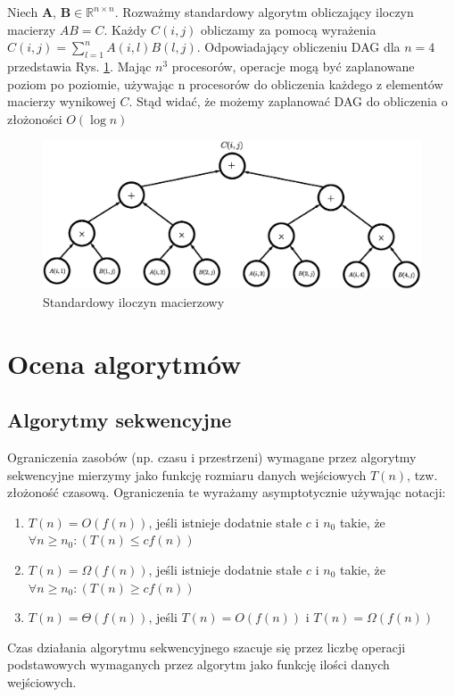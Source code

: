 \begin{przyklad}
Niech \(\mathbf{A}\), \(\mathbf{B}\in\mathbb{R}^{n\times n}\). Rozważmy standardowy algorytm obliczający iloczyn macierzy \(AB = C\). Każdy \(C(i, j)\) obliczamy za pomocą wyrażenia \(C(i, j)=\sum_{l=1}^{n}A(i,l)B(l,j)\). Odpowiadający obliczeniu DAG dla \(n=4\) przedstawia Rys. \ref{fig:standard_parallel}. Mając \(n^3\) procesorów, operacje mogą być zaplanowane poziom po poziomie, używając n procesorów do obliczenia każdego z elementów macierzy wynikowej \(C\). Stąd widać, że możemy zaplanować DAG do obliczenia o złożoności \(O(\log{n})\)
\begin{figure}[H]
\centering
\includegraphics[width=36em]{images/Rys3.eps}
\caption{Standardowy iloczyn macierzowy}
\label{fig:standard_parallel}
\end{figure}

\end{przyklad}

\section{Ocena algorytmów}
\label{subsec:algorytmy_sekwencyjne}
\subsection{Algorytmy sekwencyjne}

Ograniczenia zasobów (np. czasu i przestrzeni) wymagane przez algorytmy sekwencyjne mierzymy jako funkcję rozmiaru danych wejściowych \(T(n)\), tzw. złożoność czasową. Ograniczenia te wyrażamy asymptotycznie używając notacji:

\begin{enumerate}
\item{\(T(n) = O(f(n))\), jeśli istnieje dodatnie stałe \(c\) i \(n_0\) takie, że \(\forall{n \geq n_0}: (T(n)\leq cf(n)) \)}
\item{\(T(n) = \Omega(f(n))\), jeśli istnieje dodatnie stałe \(c\) i \(n_0\) takie, że \(\forall{n \geq n_0}: (T(n)\geq cf(n)) \)}
\item{\(T(n) = \Theta(f(n))\), jeśli \(T(n)=O(f(n))\) i \(T(n)=\Omega(f(n))\)}
\end{enumerate}
Czas działania algorytmu sekwencyjnego szacuje się przez liczbę operacji podstawowych wymaganych przez algorytm jako funkcję ilości danych wejściowych.
